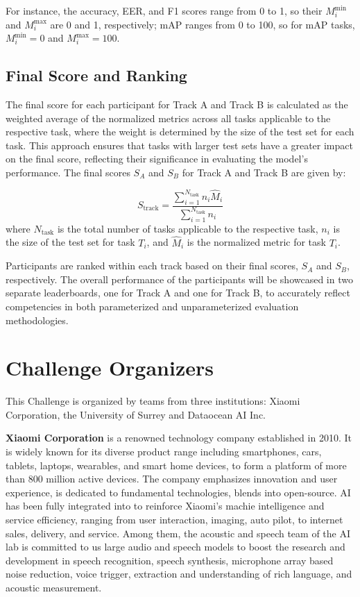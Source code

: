 \documentclass{article}
\begin{document}
For instance, the accuracy, EER, and F1 scores range from 0 to 1, so their $ M_i^{\text{min}} $ and $ M_i^{\text{max}} $ are 0 and 1, respectively; mAP ranges from 0 to 100, so for mAP tasks, $ M_i^{\text{min}} = 0 $ and $ M_i^{\text{max}} = 100 $.

\subsection{Final Score and Ranking}

The final score for each participant for Track A and Track B is calculated as the weighted average of the normalized metrics across all tasks applicable to the respective task,
where the weight is determined by the size of the test set for each task.
This approach ensures that tasks with larger test sets have a greater impact on the final score, reflecting their significance in evaluating the model's performance.
The final scores $S_A$ and $S_B$ for Track A and Track B are given by:

\begin{equation}
    S_{\text{track}} = \frac{\sum_{i=1}^{N_{\text{task}}} n_i \hat{M}_i}{\sum_{i=1}^{N_{\text{task}}} n_i}
\end{equation}
where $N_{\text{task}}$ is the total number of tasks applicable to the respective task,
$n_i$ is the size of the test set for task $T_i$,
and $\hat{M}_i$ is the normalized metric for task $T_i$.

Participants are ranked within each track based on their final scores, $S_A$ and $S_B$, respectively.
The overall performance of the participants will be showcased in two separate leaderboards,
one for Track A and one for Track B, to accurately reflect competencies in both parameterized and unparameterized evaluation methodologies.

\section{Challenge Organizers}

This Challenge is organized by teams from three institutions: Xiaomi Corporation, the University of Surrey and Dataocean AI Inc.

\textbf{Xiaomi Corporation} is a renowned technology company established in 2010. It is widely known for its diverse product range including smartphones, cars, tablets, laptops, wearables, and smart home devices, to form a platform of more than 800 million active devices. The company emphasizes innovation and user experience, is dedicated to fundamental technologies, blends into open-source.
AI has been fully integrated into to reinforce Xiaomi's machie intelligence and service efficiency, ranging from user interaction, imaging, auto pilot, to internet sales, delivery, and service. Among them, the acoustic and speech team of the AI lab is committed to us large audio and speech models to boost the research and development in speech recognition, speech synthesis, microphone array based noise reduction, voice trigger, extraction and understanding of rich language, and acoustic measurement.
\end{document}

